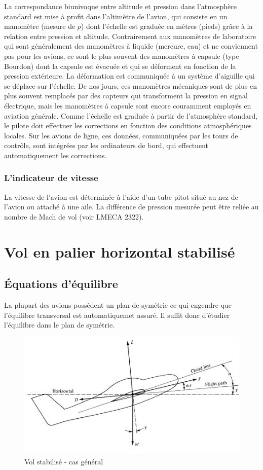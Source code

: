 \documentclass{report}
\begin{document}
La correspondance biunivoque entre altitude et pression dans l’atmosphère standard est mise à profit dans l’altimètre de l’avion, qui consiste en un manomètre (mesure de \( p \)) dont l’échelle est graduée en mètres (pieds) grâce à la relation entre pression et altitude. Contrairement aux manomètres de laboratoire qui sont généralement des manomètres à liquide (mercure, eau) et ne conviennent pas pour les avions, ce sont le plus souvent des manomètres à capsule (type Bourdon) dont la capsule est évacuée et qui se déforment en fonction de la pression extérieure. La déformation est communiquée à un système d’aiguille qui se déplace sur l’échelle. De nos jours, ces manomètres mécaniques sont de plus en plus souvent remplacés par des capteurs qui transforment la pression en signal électrique, mais les manomètres à capsule sont encore couramment
employés en aviation générale. Comme l’échelle est graduée à partir de l’atmosphère standard, le pilote doit effectuer les corrections en fonction des conditions atmosphériques locales. Sur les avions de ligne, ces données, communiquées par les tours de contrôle, sont intégrées par les ordinateurs de bord, qui effectuent automatiquement les corrections.

\subsubsection{L'indicateur de vitesse}


La vitesse de l'avion est déterminée à l'aide d'un tube pitot situé au nez de l'avion ou attaché à une aile. La différence de pression mesurée peut être reliée au nombre de Mach de vol (voir LMECA 2322).


\section{Vol en palier horizontal stabilisé}
\subsection{Équations d'équilibre}

La plupart des avions possèdent un plan de symétrie ce qui engendre que l'équilibre transversal est automatiquemet assuré. Il suffit donc d'étudier l'équilibre dans le plan de symétrie. 

\begin{figure}[h!]
    \centering
    \includegraphics{3.JPG}
    \caption{Vol stabilisé - cas général}
    \label{3}
\end{figure}
\end{document}
